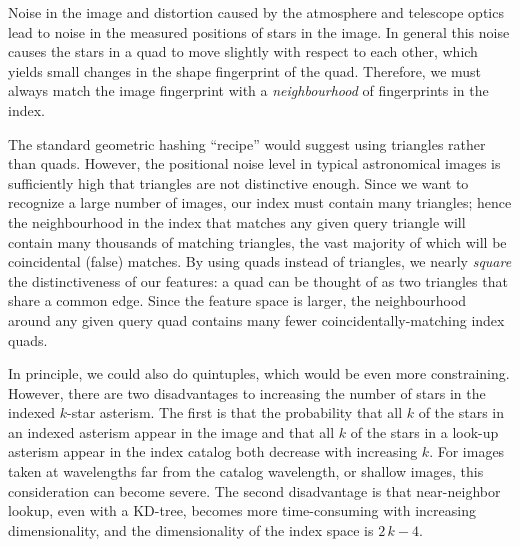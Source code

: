 \documentclass[12pt,preprint]{aastex}
\newcommand{\kdtree}{KD-tree}
\renewcommand{\%}{\percent}
\begin{document}
Noise in the image and distortion caused by the atmosphere and telescope optics
lead to noise in the measured positions of stars in the image.  In general this
noise causes the stars in a quad to move slightly with respect to each other,
which yields small changes in the shape fingerprint of the quad.  Therefore, we
must always match the image fingerprint with a \emph{neighbourhood} of
fingerprints in the index.

The standard geometric hashing ``recipe'' \citep{geometrichashing}
would suggest using triangles rather than quads.  However, the
positional noise level in typical astronomical images is sufficiently
high that triangles are not distinctive enough.  Since we want to
recognize a large number of images, our index must contain many
triangles; hence the neighbourhood in the index that matches any given
query triangle will contain many thousands of matching triangles, the
vast majority of which will be coincidental (false) matches.  By using
quads instead of triangles, we nearly \emph{square} the
distinctiveness of our features: a quad can be thought of as two
triangles that share a common edge.  Since the feature space is
larger, the neighbourhood around any given query quad contains many
fewer coincidentally-matching index quads.

In principle, we could also do quintuples, which would be even more
constraining.  However, there are two disadvantages to increasing the
number of stars in the indexed $k$-star asterism.  The first is that
the probability that all $k$ of the stars in an indexed asterism
appear in the image and that all $k$ of the stars in a look-up
asterism appear in the index catalog both decrease with increasing
$k$.  For images taken at wavelengths far from the catalog wavelength,
or shallow images, this consideration can become severe.  The second
disadvantage is that near-neighbor lookup, even with a \kdtree,
becomes more time-consuming with increasing dimensionality, and the
dimensionality of the index space is $2\,k-4$.
\end{document}
